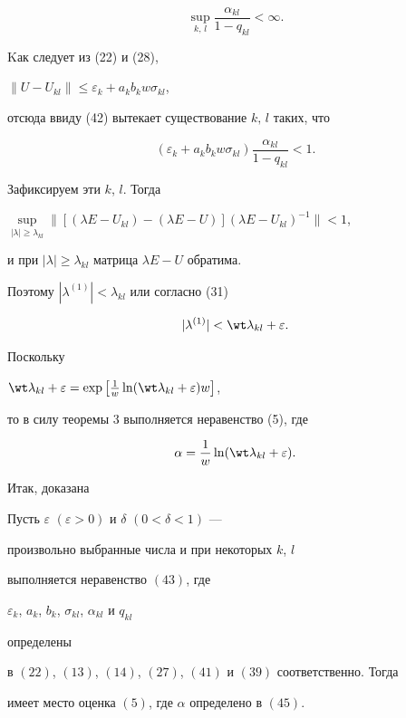 \begin{equation}


\sup_{k,\,l}\frac{\alpha_{kl}}{1-q_{kl}}<\infty.


\end{equation}


Kак следует из (22) и (28),


$\|U-U_{kl}\|\le {\varepsilon}_k+a_kb_kw\sigma_{kl}$,


отсюда ввиду (42) вытекает существование $k,\,l$ таких, что


\begin{equation}


({\varepsilon}_k+a_kb_kw\sigma_{kl})\frac{\alpha_{kl}}{1-q_{kl}}<1.


\end{equation}


Зафиксируем эти $k$, $l$. Тогда


$\sup\limits_{|\lambda|\ge\lambda_{kl}}\|


[(\lambda E-U_{kl})-(\lambda E-U)](\lambda E-U_{kl})^{-1}\|<1$,


и при $|\lambda|\ge\lambda_{kl}$ матрица $\lambda E-U$ обратима.


Поэтому $|\lambda^{(1)}|<\lambda_{kl}$ или согласно (31)


\begin{equation}


|\lambda^{(1)}|<\wt\lambda_{kl}+{\varepsilon}.


\end{equation}


Поскольку


${\wt\lambda_{kl}+{\varepsilon}=\exp\big[\frac{1}{w}


\ln(\wt\lambda_{kl}+{\varepsilon})w\big]}$,


то в силу теоремы 3 выполняется неравенство (5), где


\begin{equation}


\alpha=\frac{1}{w}\ln(\wt\lambda_{kl}+{\varepsilon}).


\end{equation}


Итак, доказана





\begin{thm}


Пусть ${\varepsilon}$ $({\varepsilon}>0)$ и $\delta$ $(0<\delta<1)$ ---


произвольно выбранные числа и при некоторых $k$, $l$


выполняется неравенство $(43)$, где


${\varepsilon}_k$, $a_k$, $b_k$, $\sigma_{kl}$, $\alpha_{kl}$ и $q_{kl}$


определены


в $(22)$, $(13)$, $(14)$, $(27)$, $(41)$ и $(39)$ соответственно. Тогда


имеет место оценка $(5)$, где $\alpha$ определено в $(45)$.


\end{thm}





